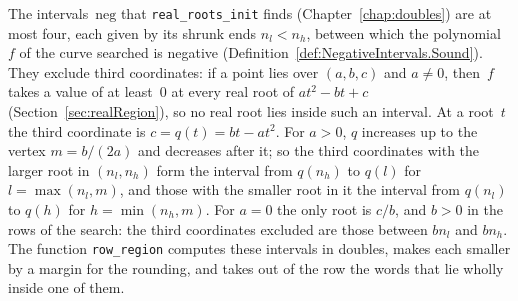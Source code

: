 The intervals~$\mathrm{neg}$ that \texttt{real\_roots\_init} finds (Chapter~\ref{chap:doubles}) are
at most four, each given by its shrunk ends $n_l < n_h$, between which the polynomial~$f$ of the
curve searched is negative (Definition~\ref{def:NegativeIntervals.Sound}). They exclude third
coordinates: if a point lies over $(a, b, c)$ and $a \ne 0$, then~$f$ takes a value of at
least~$0$ at every real root of $a t^2 - b t + c$ (Section~\ref{sec:realRegion}), so no real root
lies inside such an interval. At a root~$t$ the third coordinate is $c = q(t) = bt - at^2$. For
$a > 0$, $q$ increases up to the vertex $m = b/(2a)$ and decreases after it; so the third
coordinates with the larger root in $(n_l, n_h)$ form the interval from $q(n_h)$ to $q(l)$ for
$l = \max(n_l, m)$, and those with the smaller root in it the interval from $q(n_l)$ to $q(h)$ for
$h = \min(n_h, m)$. For $a = 0$ the only root is $c/b$, and $b > 0$ in the rows of the search: the
third coordinates excluded are those between $b n_l$ and $b n_h$. The function
\texttt{row\_region} computes these intervals in doubles, makes each smaller by a margin for the
rounding, and takes out of the row the words that lie wholly inside one of them.

